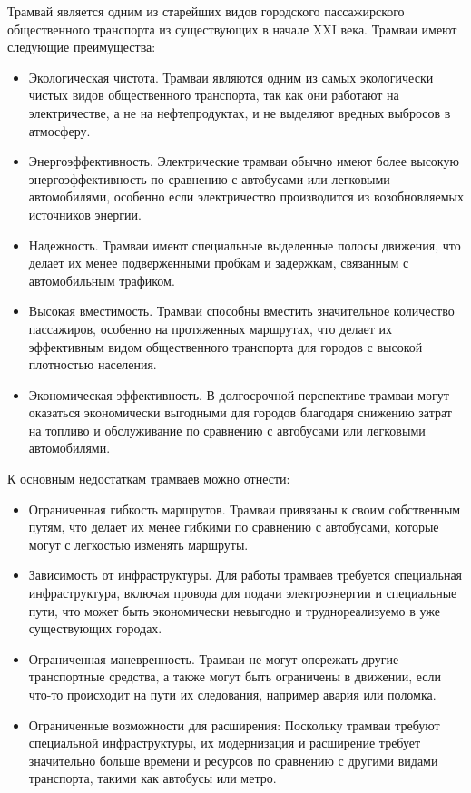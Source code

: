 Трамвай является одним из старейших видов городского пассажирского общественного транспорта из существующих в начале XXI века. Трамваи имеют следующие преимущества:
\begin{itemize}
	\item Экологическая чистота. Трамваи являются одним из самых экологически чистых видов общественного транспорта, так как они работают на электричестве, а не на нефтепродуктах, и не выделяют вредных выбросов в атмосферу.
	\item Энергоэффективность. Электрические трамваи обычно имеют более высокую энергоэффективность по сравнению с автобусами или легковыми автомобилями, особенно если электричество производится из возобновляемых источников энергии.
	\item Надежность. Трамваи имеют специальные выделенные полосы движения, что делает их менее подверженными пробкам и задержкам, связанным с автомобильным трафиком.
	\item Высокая вместимость. Трамваи способны вместить значительное количество пассажиров, особенно на протяженных маршрутах, что делает их эффективным видом общественного транспорта для городов с высокой плотностью населения.
	\item Экономическая эффективность. В долгосрочной перспективе трамваи могут оказаться экономически выгодными для городов благодаря снижению затрат на топливо и обслуживание по сравнению с автобусами или легковыми автомобилями.
\end{itemize}

К основным недостаткам трамваев можно отнести:
\begin{itemize}
	\item Ограниченная гибкость маршрутов. Трамваи привязаны к своим собственным путям, что делает их менее гибкими по сравнению с автобусами, которые могут с легкостью изменять маршруты.
	\item Зависимость от инфраструктуры. Для работы трамваев требуется специальная инфраструктура, включая провода для подачи электроэнергии и специальные пути, что может быть экономически невыгодно и труднореализуемо в уже существующих городах.
	\item Ограниченная маневренность. Трамваи не могут опережать другие транспортные средства, а также могут быть ограничены в движении, если что-то происходит на пути их следования, например авария или поломка.
	\item Ограниченные возможности для расширения: Поскольку трамваи требуют специальной инфраструктуры, их модернизация и расширение требует значительно больше времени и ресурсов по сравнению с другими видами транспорта, такими как автобусы или метро.
\end{itemize}

